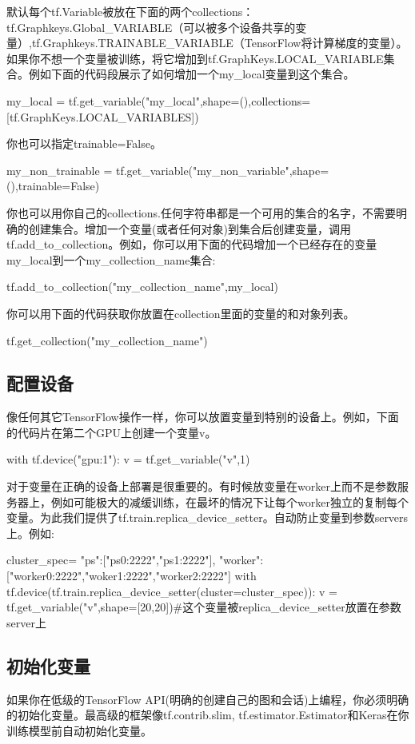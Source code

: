 默认每个tf.Variable被放在下面的两个collections：tf.Graphkeys.Global\_VARIABLE（可以被多个设备共享的变量）,tf.Graphkeys.TRAINABLE\_VARIABLE（TensorFlow将计算梯度的变量）。如果你不想一个变量被训练，将它增加到tf.GraphKeys.LOCAL\_VARIABLE集合。例如下面的代码段展示了如何增加一个my\_local变量到这个集合。
\begin{python}
my_local = tf.get_variable("my_local",shape=(),collections=[tf.GraphKeys.LOCAL_VARIABLES])
\end{python}
你也可以指定trainable=False。
\begin{python}
my_non_trainable = tf.get_variable("my_non_variable",shape=(),trainable=False)
\end{python}
你也可以用你自己的collections.任何字符串都是一个可用的集合的名字，不需要明确的创建集合。增加一个变量(或者任何对象)到集合后创建变量，调用tf.add\_to\_collection。例如，你可以用下面的代码增加一个已经存在的变量my\_local到一个my\_collection\_name集合:
\begin{python}
	tf.add_to_collection("my_collection_name",my_local)
\end{python}
你可以用下面的代码获取你放置在collection里面的变量的和对象列表。
\begin{python}
tf.get_collection("my_collection_name")
\end{python}
\subsection{配置设备}
像任何其它TensorFlow操作一样，你可以放置变量到特别的设备上。例如，下面的代码片在第二个GPU上创建一个变量v。
\begin{python}
with tf.device("gpu:1"):
    v = tf.get_variable("v",1)
\end{python}
对于变量在正确的设备上部署是很重要的。有时候放变量在worker上而不是参数服务器上，例如可能极大的减缓训练，在最坏的情况下让每个worker独立的复制每个变量。为此我们提供了tf.train.replica\_device\_setter。自动防止变量到参数servers上。例如:
\begin{python}
cluster_spec={
	"ps":["ps0:2222","ps1:2222"],
	"worker":["worker0:2222","woker1:2222","worker2:2222"]}
with tf.device(tf.train.replica_device_setter(cluster=cluster_spec)):
    v = tf.get_variable("v",shape=[20,20])#这个变量被replica_device_setter放置在参数server上
\end{python}
\subsection{初始化变量}
{\color{red}{在使用变量之前，你必须对变量进行初始化。}}如果你在低级的TensorFlow API(明确的创建自己的图和会话)上编程，你必须明确的初始化变量。最高级的框架像tf.contrib.slim,\newline
tf.estimator.Estimator和Keras在你训练模型前自动初始化变量。


